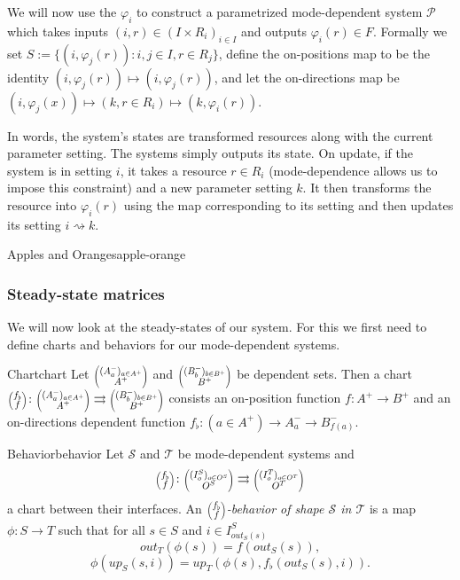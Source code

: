 \documentclass[12pt, a4paper]{article}
\theoremstyle{definition}
\theoremstyle{plain}
\theoremstyle{plain}
\theoremstyle{plain}
\theoremstyle{plain}
\theoremstyle{plain}
\theoremstyle{remark}
\theoremstyle{remark}
\newcommand{\mc}[1]{\mathcal{#1}}
\newcommand{\lens}[2]{\scaleobj{0.6}{\begin{pmatrix} \scaleobj{1.3}{{#1}} \\ \scaleobj{1.3}{{#2}} \end{pmatrix}}}
\begin{document}
We will now use the $\varphi_i$ to construct a parametrized mode-dependent system $\mc{P}$ which takes inputs $(i, r) \in (I \times R_i)_{i \in I}$ and outputs $\varphi_i(r) \in F$. Formally we set $S := \{ (i,\varphi_j(r)) : i,j \in I, r \in R_j \}$, define the on-positions map to be the identity $(i,\varphi_j(r)) \mapsto (i,\varphi_j(r))$, and let the on-directions map be $(i,\varphi_j(x))\mapsto (k,r \in R_i) \mapsto (k,\varphi_i(r))$. 

In words, the system's states are transformed resources along with the current parameter setting. The systems simply outputs its state. On update, if the system is in setting $i$, it takes a resource $r \in R_i$ (mode-dependence allows us to impose this constraint) and a new parameter setting $k$. It then transforms the resource into $\varphi_i(r)$ using the map corresponding to its setting and then updates its setting $i \rightsquigarrow k$.

\begin{tcexample}{Apples and Oranges}{apple-orange}

\end{tcexample}

\subsubsection{Steady-state matrices}
We will now look at the steady-states of our system. For this we first need to define charts and behaviors for our mode-dependent systems.

\begin{tcdefinition}{Chart}{chart}
	Let $\lens{(A^-_a)_{a \in A^+}}{A^+}$ and $\lens{(B^-_b)_{b \in B^+}}{B^+}$ be dependent sets. Then a chart $\lens{f_\flat}{f} \colon \lens{(A^-_a)_{a \in A^+}}{A^+} \rightrightarrows \lens{(B^-_b)_{b \in B^+}}{B^+}$ consists an on-position function $f \colon A^+ \rightarrow B^+$ and an on-directions dependent function $f_\flat \colon (a \in A^+) \rightarrow A^-_a \rightarrow B^-_{f(a)}$.
\end{tcdefinition}

\begin{tcdefinition}{Behavior}{behavior}
	Let $\mc{S}$ and $\mc{T}$ be mode-dependent systems and $$\lens{f_\flat}{f} \colon \lens{(I^S_o)_{o \in O^S}}{O^S} \rightrightarrows \lens{(I^T_o)_{o \in O^T}}{O^T}$$
	a chart between their interfaces. An \emph{$\lens{f_\flat}{f}$-behavior of shape $\mc{S}$ in $\mc{T}$} is a map $\phi: S \rightarrow T$ such that for all $s \in S$ and $i \in I^S_{out_S(s)}$
	$$out_T(\phi(s)) = f(out_S(s)), $$
	$$\phi(up_S(s,i)) = up_T(\phi(s), f_\flat(out_S(s),i)).$$
\end{tcdefinition}
\end{document}
